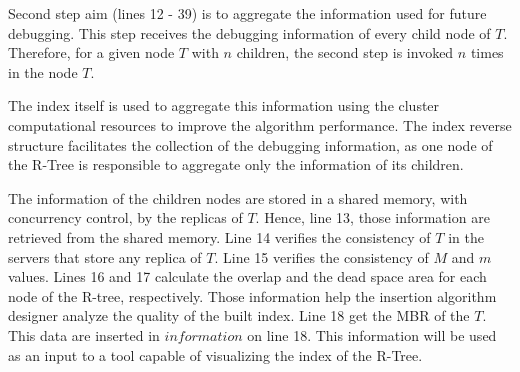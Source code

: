 Second step aim (lines 12 - 39) is to aggregate the information used for future debugging. This step receives the debugging information of every child node of $T$. 
Therefore, for a given node $T$ with $n$ children, the second step is invoked $n$ times in the node $T$.

The index itself is used to aggregate this information using the cluster computational resources to improve the algorithm performance.
The index reverse structure facilitates the collection of the debugging information, 
as one node of the R-Tree is responsible to aggregate only the information of its children. 

The information of the children nodes are stored in a shared memory, with concurrency control, by the replicas of $T$. Hence, line 13, those information are retrieved from the shared memory. 
Line 14 verifies the consistency of $T$ in the servers that store any replica of $T$. Line 15 verifies the consistency of $M$ and $m$ values. 
Lines 16 and 17 calculate the overlap and the dead space area for each node of the R-tree, respectively. Those information help the insertion algorithm designer analyze the quality of the built index. 
Line 18 get the MBR of the $T$. This data are inserted in $information$ on line 18. This information will be used as an input to a tool capable of visualizing the index of the R-Tree.

